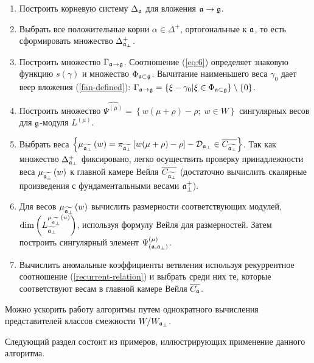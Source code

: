 \begin{enumerate}
\item Построить корневую систему $\Delta _{\mathfrak{a}}$ для вложения $\mathfrak{a}\rightarrow \mathfrak{g}$.

\item Выбрать все положительные корни $\alpha \in \Delta ^{+}$, ортогональные к  $\mathfrak{a}$, то есть сформировать множество $\Delta_{\mathfrak{a}_{\perp} }^{+}$.

\item Построить множество $\Gamma _{\mathfrak{a}\rightarrow \mathfrak{g}}$. Соотношение  (\ref{eq:6}) определяет знаковую функцию $s(\gamma)$ и множество $\Phi_{\mathfrak{a}\subset \mathfrak{g}}$. Вычитание наименьшего веса $\gamma_0$ дает веер вложения (\ref{fan-defined}):
 $\Gamma _{\mathfrak{a}\rightarrow \mathfrak{g}}=\left\{ \xi -\gamma _{0}|\xi \in \Phi _{\mathfrak{a}\subset \mathfrak{g}}\right\} \setminus \left\{ 0\right\}$.

\item Построить множество $\widehat{\Psi ^{(\mu )}}=\left\{ w (\mu +\rho
)-\rho ;\;w \in W\right\} $ сингулярных весов для  $\mathfrak{g}$-модуля $L^{(\mu )}$.

\item Выбрать веса $\left\{ \mu _{\widetilde{\mathfrak{a}_{\perp}}}\left( w\right) =\pi _{\widetilde{\mathfrak{a}_{\perp}}}\left[ w(\mu +\rho
)-\rho \right] -\mathcal{D}_{\mathfrak{a}_{\perp}}\in \overline{C_{\widetilde{\mathfrak{a}_{\perp}}}}\right\} $. Так как множество  $\Delta_{\mathfrak{a}_{\perp} }^{+}$ фиксировано, легко осуществить проверку принадлежности веса $\mu _{\widetilde{\mathfrak{a}_{\perp}}}\left( w\right) $ к главной камере Вейля $\overline{C_{\widetilde{\mathfrak{a}_{\perp}}}}$ (достаточно вычислить скалярные произведения с фундаментальными весами $\mathfrak{a}_{\perp}^{+}$).

\item Для весов $\mu _{\widetilde{\mathfrak{a}_{\perp}}}\left( w\right) $ вычислить размерности соответствующих модулей, $\mathrm{\dim }\left(L_{\widetilde{\mathfrak{a}_{\perp}}}^{\mu _{\widetilde{\mathfrak{a}_{\perp}}}\left( u\right) }\right) $, используя формулу Вейля для размерностей. Затем построить сингулярный элемент $\Psi ^{\left( \mu \right) }_{\left(  \mathfrak{a}, \mathfrak{a}_{\perp} \right)}$.

\item Вычислить аномальные коэффициенты ветвления используя рекуррентное соотношение (\ref{recurrent-relation}) и выбрать среди них те, которые соответствуют весам в главной камере Вейля $\overline{C_{\mathfrak{a}}}$.
\end{enumerate}

Можно ускорить работу алгоритмы путем однократного вычисления представителей классов смежности $W/W_{\mathfrak{a}_{\perp} }$.

Следующий раздел состоит из примеров, иллюстрирующих применение данного алгоритма.

